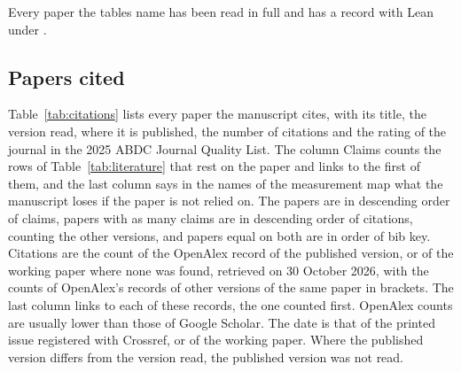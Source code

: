 Every paper the tables name has been read in full and has a record with Lean
under .

\subsection{Papers cited}

Table~\ref{tab:citations} lists every paper the manuscript cites, with its
title, the version read, where it is published, the number of citations and the
rating of the journal in the 2025 ABDC Journal Quality List. The column Claims
counts the rows of Table~\ref{tab:literature} that rest on the paper and links to
the first of them, and the last column says in the names of the measurement map
what the manuscript loses if the paper is not relied on. The papers are in
descending order of claims, papers with as many claims are in descending order of
citations, counting the other versions, and papers equal on both are in order of
bib key. Citations are the count of the OpenAlex record
of the published version, or of the working paper where none was found,
retrieved on 30 October 2026, with the counts of OpenAlex's records of other
versions of the same paper in brackets. The last column links to each of these
records, the one counted first. OpenAlex counts are usually lower than those of Google
Scholar. The date is that of the printed issue registered with Crossref, or of
the working paper. Where the published version differs from the version read,
the published version was not read.

